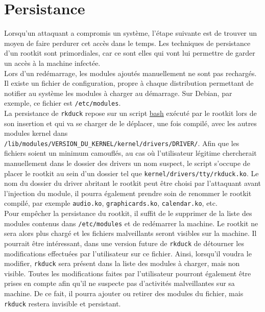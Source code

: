 \documentclass[12pt]{article}
\begin{document}

\section{Persistance}

    Lorsqu'un attaquant a compromis un système, l'étape suivante est de trouver un moyen de faire perdurer cet accès dans le temps. Les techniques de persistance d'un rootkit sont primordiales, car ce sont elles qui vont lui permettre de garder un accès à la machine infectée. \\ 

    Lors d'un redémarrage, les modules ajoutés manuellement ne sont pas rechargés. Il existe un fichier de configuration, propre à chaque distribution permettant de notifier au système les modules à charger au démarrage. Sur Debian, par exemple, ce fichier est \texttt{/etc/modules}. \\

    La persistance de \texttt{rkduck} repose sur un script \href{https://github.com/QuokkaLight/rkduck/blob/master/forever.sh}{bash} exécuté par le rootkit lors de son insertion et qui va se charger de le déplacer, une fois compilé, avec les autres modules kernel dans \texttt{/lib/modules/VERSION\_DU\_KERNEL/kernel/drivers/DRIVER/}. Afin que les fichiers soient un minimum camouflés, au cas où l'utilisateur légitime chercherait manuellement dans le dossier des drivers un nom suspect, le script s'occupe de placer le rootkit au sein d'un dossier tel que \texttt{kernel/drivers/tty/rkduck.ko}. Le nom du dossier du driver abritant le rootkit peut être choisi par l'attaquant avant l'injection du module, il pourra également prendre soin de renommer le rootkit compilé, par exemple \texttt{audio.ko}, \texttt{graphicards.ko}, \texttt{calendar.ko}, etc. \\

    Pour empêcher la persistance du rootkit, il suffit de le supprimer de la liste des modules contenus dans \texttt{/etc/modules} et de redémarrer la machine. Le rootkit ne sera alors plus chargé et les fichiers malveillants seront visibles sur la machine. Il pourrait être intéressant, dans une version future de \texttt{rkduck} de détourner les modifications effectuées par l'utilisateur sur ce fichier. Ainsi, lorsqu'il voudra le modifier, \texttt{rkduck} sera présent dans la liste des modules à charger, mais non visible. Toutes les modifications faites par l'utilisateur pourront également être prises en compte afin qu'il ne suspecte pas d'activités malveillantes sur sa machine. De ce fait, il pourra ajouter ou retirer des modules du fichier, mais \texttt{rkduck} restera invisible et persistant.
\end{document}
